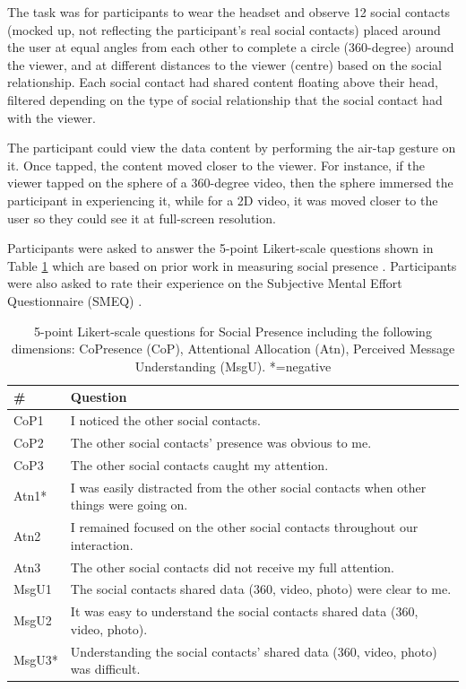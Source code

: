 The task was for participants to wear the headset and observe 12 social contacts (mocked up, not reflecting the participant's real social contacts) placed around the user at equal angles from each other to complete a circle (360-degree) around the viewer, and at different distances to the viewer (centre) based on the social relationship. Each social contact had shared content floating above their head, filtered depending on the type of social relationship that the social contact had with the viewer. 

The participant could view the data content by performing the air-tap gesture on it. Once tapped, the content moved closer to the viewer. For instance, if the viewer tapped on the sphere of a 360-degree video, then the sphere immersed the participant in experiencing it, while for a 2D video, it was moved closer to the user so they could see it at full-screen resolution.

Participants were asked to answer the 5-point Likert-scale questions shown in Table \ref{tbl:chi18:questions} which are based on prior work in measuring social presence \cite{Biocca2003}. Participants were also asked to rate their experience on the Subjective Mental Effort Questionnaire (SMEQ) \cite{Sauro2009}. 

\begin{table}[ht]
    \centering
    \begin{tabular}{l p{10cm}}
        \hline
        \#  & Question \\ \hline
        CoP1 & I noticed the other social contacts.  \\
        CoP2 & The other social contacts' presence was obvious to me. \\
        CoP3 & The other social contacts caught my attention. \\ \hline
        Atn1* & I was easily distracted from the other social contacts when other things were going on. \\
        Atn2 & I remained focused on the other social contacts throughout our interaction. \\
        Atn3 & The other social contacts did not receive my full attention.  \\ \hline
        MsgU1 & The social contacts shared data (360, video, photo) were clear to me.  \\
        MsgU2 & It was easy to understand the social contacts shared data (360, video, photo).  \\
        MsgU3* & Understanding the social contacts' shared data (360, video, photo) was difficult.  \\ \hline
    \end{tabular}
    \caption{5-point Likert-scale questions for Social Presence including the following dimensions: CoPresence (CoP), Attentional Allocation (Atn), Perceived Message Understanding (MsgU). *=negative} 
      \label{tbl:chi18:questions}
\end{table}

